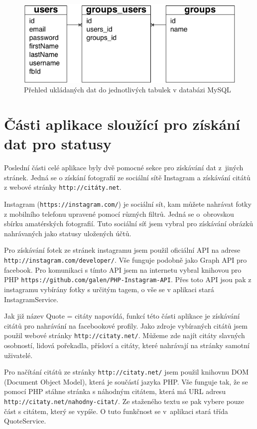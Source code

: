 \documentclass[thesis=M,czech]{FITthesis}[2013/05/10]
\begin{document}
\begin{figure}[h]
\begin{center}
\includegraphics[width=5in]{figures/mysqlDataModel.png}
\caption{Přehled ukládaných dat do jednotlivých tabulek v databázi MySQL}
\label{fig:mysqlDataModel}
\end{center}
\end{figure}

\section{Části aplikace sloužící pro získání dat pro statusy}

Poslední části celé aplikace byly dvě pomocné sekce pro získávání dat z~jiných stránek. Jedná se o získání fotografií ze sociální sítě Instagram a získávání citátů z webové stránky \verb|http://citáty.net|.

Instagram (\verb|https://instagram.com/|) je sociální sít, kam můžete nahrávat fotky z mobilního telefonu upravené pomocí různých filtrů. Jedná se o~obrovskou sbírku amatérských fotografií. Tuto sociální síť jsem vybral pro získávání obrázků nahrávaných jako statusy uložených účtů. 

Pro získávání fotek ze stránek instagramu jsem použil oficiální API na adrese \verb|http://instagram.com/developer/|. Vše funguje podobně jako Graph API pro facebook. Pro komunikaci s tímto API jsem na internetu vybral knihovou pro PHP \verb|https://github.com/galen/PHP-Instagram-API|. Přes toto API jsou pak z instagramu vybírány fotky s určitým tagem, o vše se v aplikaci stará InstagramService.

Jak již název Quote = citáty napovídá, funkcí této části aplikace je získávání citátů pro nahrávání na facebookové profily. Jako zdroje vybíraných citátů jsem použil webové stránky \verb|http://citaty.net/|. Můžeme zde najít citáty slavných osobností, lidová pořekadla, přísloví a citáty, které nahrávají na stránky samotní uživatelé. 

Pro načítání citátů ze stránky \verb|http://citaty.net/| jsem použil knihovnu DOM (Document Object Model), která je součástí jazyka PHP. Vše funguje tak, že se pomocí PHP stáhne stránka s náhodným citátem, která má URL adresu \verb|http://citaty.net/nahodny-citat/|. Ze staženého textu se pak vybere pouze část s citátem, který se vypíše. O tuto funkčnost se v~aplikaci stará třída QuoteService.
\end{document}
